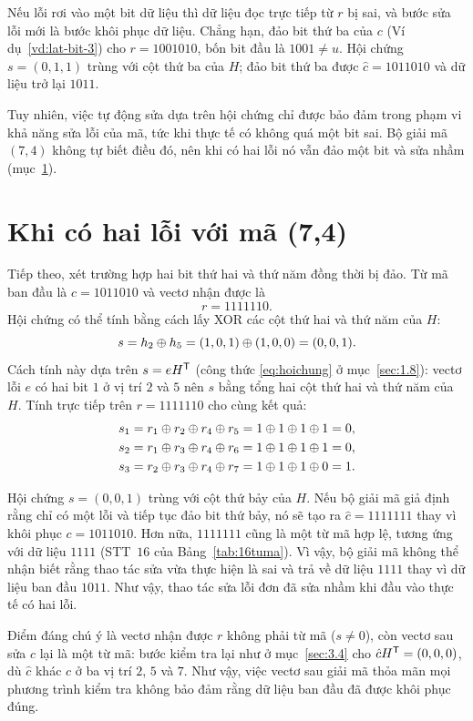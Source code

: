 Nếu lỗi rơi vào một bit dữ liệu thì dữ liệu đọc trực tiếp từ $r$ bị sai, và
bước sửa lỗi mới là bước khôi phục dữ liệu. Chẳng hạn, đảo bit thứ ba của $c$
(Ví dụ~\ref{vd:lat-bit-3}) cho $r = 1001010$, bốn bit đầu là $1001 \neq u$. Hội
chứng $s = (0,1,1)$ trùng với cột thứ ba của $H$; đảo bit thứ ba được
$\hat{c} = 1011010$ và dữ liệu trở lại $1011$.

Tuy nhiên, việc tự động sửa dựa trên
hội chứng chỉ được bảo đảm trong phạm vi khả năng sửa lỗi của mã, tức khi thực
tế có không quá một bit sai. Bộ giải mã $(7,4)$ không tự biết điều đó, nên khi
có hai lỗi nó vẫn đảo một bit và sửa nhầm (mục~\ref{sec:3.5}).

\section{Khi có hai lỗi với mã (7,4)}
\label{sec:3.5}

Tiếp theo, xét trường hợp hai bit thứ hai và thứ năm đồng thời bị đảo. Từ mã
ban đầu là $c = 1011010$ và vectơ nhận được là
\[
  r = 1111110 .
\]
Hội chứng có thể tính bằng cách lấy XOR các cột thứ hai và thứ năm của $H$:
\[
  s = h_2 \oplus h_5 = (1,0,1) \oplus (1,0,0) = (0,0,1) .
\]
Cách tính này dựa trên $s = eH^{\mathsf{T}}$ (công thức \eqref{eq:hoichung} ở
mục~\ref{sec:1.8}): vectơ lỗi $e$ có hai bit $1$ ở vị trí $2$ và $5$ nên $s$ bằng
tổng hai cột thứ hai và thứ năm của $H$. Tính trực tiếp trên $r = 1111110$ cho
cùng kết quả:
\begin{align*}
  s_1 &= r_1 \oplus r_2 \oplus r_4 \oplus r_5 = 1 \oplus 1 \oplus 1 \oplus 1 = 0,\\*
  s_2 &= r_1 \oplus r_3 \oplus r_4 \oplus r_6 = 1 \oplus 1 \oplus 1 \oplus 1 = 0,\\*
  s_3 &= r_2 \oplus r_3 \oplus r_4 \oplus r_7 = 1 \oplus 1 \oplus 1 \oplus 0 = 1 .
\end{align*}

Hội chứng $s = (0,0,1)$ trùng với cột thứ bảy của $H$. Nếu bộ giải mã giả định
rằng chỉ có một lỗi và tiếp tục đảo bit thứ bảy, nó sẽ tạo ra $\hat{c} = 1111111$
thay vì khôi phục $c = 1011010$. Hơn nữa, $1111111$ cũng là một từ mã hợp lệ, tương ứng với
dữ liệu $1111$ (STT~$16$ của Bảng~\ref{tab:16tuma}). Vì vậy, bộ giải mã không
thể nhận biết rằng thao tác sửa vừa thực hiện là sai và trả về dữ liệu $1111$
thay vì dữ liệu ban đầu $1011$. Như vậy, thao tác sửa lỗi đơn đã sửa nhầm khi
đầu vào thực tế có hai lỗi.

Điểm đáng chú ý là vectơ nhận được $r$ không phải từ mã ($s \neq 0$), còn vectơ
sau sửa $\hat{c}$ lại là một từ mã: bước kiểm tra lại như ở mục~\ref{sec:3.4}
cho $\hat{c}H^{\mathsf{T}} = (0,0,0)$, dù $\hat{c}$ khác $c$ ở ba vị trí $2$, $5$ và $7$.
Như vậy, việc vectơ sau giải mã thỏa mãn mọi phương trình kiểm tra không bảo đảm
rằng dữ liệu ban đầu đã được khôi phục đúng.

